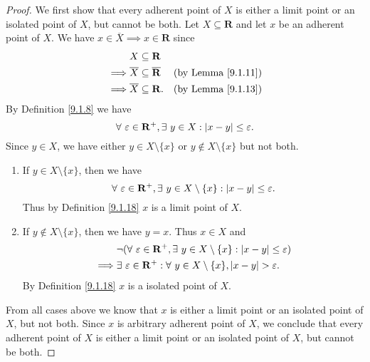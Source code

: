 \begin{proof}
    We first show that every adherent point of \(X\) is either a limit point or an isolated point of \(X\), but cannot be both.
    Let \(X \subseteq \mathbf{R}\) and let \(x\) be an adherent point of \(X\).
    We have \(x \in \overline{X} \implies x \in \mathbf{R}\) since
    \begin{align*}
                 & X \subseteq \mathbf{R}                                                        \\
        \implies & \overline{X} \subseteq \overline{\mathbf{R}} & \text{(by Lemma \ref{9.1.11})} \\
        \implies & \overline{X} \subseteq \mathbf{R}.           & \text{(by Lemma \ref{9.1.13})}
    \end{align*}
    By Definition \ref{9.1.8} we have
    \[
        \forall\ \varepsilon \in \mathbf{R}^+, \exists\ y \in X : \abs*{x - y} \leq \varepsilon.
    \]
    Since \(y \in X\), we have either \(y \in X \setminus \{x\}\) or \(y \notin X \setminus \{x\}\) but not both.
    \begin{enumerate}
        \item If \(y \in X \setminus \{x\}\), then we have
              \[
                  \forall\ \varepsilon \in \mathbf{R}^+, \exists\ y \in X \setminus \{x\} : \abs*{x - y} \leq \varepsilon.
              \]
              Thus by Definition \ref{9.1.18} \(x\) is a limit point of \(X\).
        \item If \(y \notin X \setminus \{x\}\), then we have \(y = x\).
              Thus \(x \in X\) and
              \begin{align*}
                           & \lnot(\forall\ \varepsilon \in \mathbf{R}^+, \exists\ y \in X \setminus \{x\} : \abs*{x - y} \leq \varepsilon) \\
                  \implies & \exists\ \varepsilon \in \mathbf{R}^+ : \forall\ y \in X \setminus \{x\}, \abs*{x - y} > \varepsilon.
              \end{align*}
              By Definition \ref{9.1.18} \(x\) is a isolated point of \(X\).
    \end{enumerate}
    From all cases above we know that \(x\) is either a limit point or an isolated point of \(X\), but not both.
    Since \(x\) is arbitrary adherent point of \(X\), we conclude that every adherent point of \(X\) is either a limit point or an isolated point of \(X\), but cannot be both.


\end{proof}
